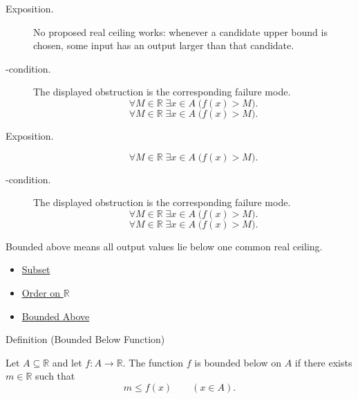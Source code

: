 \begin{remark*}
\begin{description}
  \item[Exposition.]
No proposed real ceiling works: whenever a candidate upper bound is chosen,
some input has an output larger than that candidate.


  \item[\exists-condition.]
  The displayed obstruction is the corresponding failure mode.
  \[
  \forall M\in\mathbb{R}\;\exists x\in A\;\bigl(f(x)>M\bigr).
\]
  \[
  \forall M\in\mathbb{R}\;\exists x\in A\;\bigl(f(x)>M\bigr).
\]
\end{description}
\end{remark*}

\begin{remark*}
\begin{description}
  \item[Exposition.]
\[
  \forall M\in\mathbb{R}\;\exists x\in A\;\bigl(f(x)>M\bigr).
\]


  \item[\exists-condition.]
  The displayed obstruction is the corresponding failure mode.
  \[
  \forall M\in\mathbb{R}\;\exists x\in A\;\bigl(f(x)>M\bigr).
\]
  \[
  \forall M\in\mathbb{R}\;\exists x\in A\;\bigl(f(x)>M\bigr).
\]
\end{description}
\end{remark*}

\begin{remark*}[Interpretation]
Bounded above means all output values lie below one common real ceiling.
\end{remark*}

\begin{dependencies}
\begin{itemize}
  \item \hyperref[def:subset]{Subset}
  \item \hyperref[def:order-on-r]{Order on $\mathbb{R}$}
  \item \hyperref[def:bounded-above]{Bounded Above}
\end{itemize}
\end{dependencies}

\begin{definitionbox}{Definition (Bounded Below Function)}
\begin{definition}
\label{def:function-bounded-below}
Let $A\subseteq\mathbb{R}$ and let $f:A\to\mathbb{R}$.  The function
$f$ is bounded below on $A$ if there exists $m\in\mathbb{R}$ such that
\[
  m\leq f(x)
  \qquad (x\in A).
\]
\end{definition}
\end{definitionbox}

